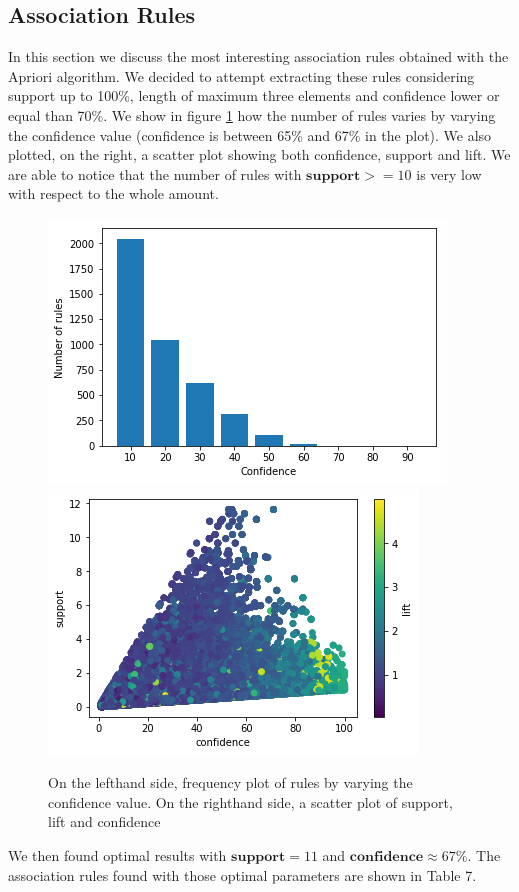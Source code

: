 \documentclass{article}
\begin{document}
	
	\subsection{Association Rules}
	In this section we discuss the most interesting association rules obtained with the Apriori algorithm. 
	We decided to attempt extracting these rules considering support up to 100\%, length of maximum three elements and confidence lower or equal than 70\%. We show in figure \ref{fig:hyper_rf} how the number of rules varies by varying the confidence value (confidence is between 65\% and 67\% in the plot). We also plotted, on the right, a scatter plot showing both confidence, support and lift. We are able to notice that the number of rules with $\mathbf{support} >= 10$ is very low with respect to the whole amount.
	
	
	\begin{figure}[]
		\centering
		\includegraphics[width=.4\textwidth]{rules.png}\hspace{1cm}
		\includegraphics[width=.4\textwidth]{AbusivismoEdilizio.png}
		\caption{On the lefthand side, frequency plot of rules by varying the confidence value. On the righthand side, a scatter plot of support, lift and confidence}
		\label{fig:hyper_rf}
	\end{figure}
	
	We then found optimal results with $\mathbf{support} = 11$ and $\mathbf{confidence} \approx 67\%$.  
	The association rules found with those optimal parameters are shown in Table 7.
	
\end{document}
